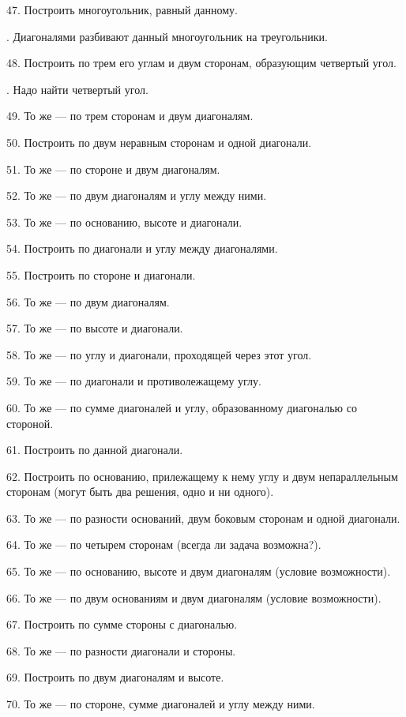 \documentclass[oneside]{book}
\begin{document}
47.
Построить многоугольник, равный данному.

.
Диагоналями разбивают данный многоугольник на треугольники.

48.
Построить  по трем его углам и двум сторонам, образующим четвертый угол.

.
Надо найти четвертый угол.

49.
То же — по трем сторонам и двум диагоналям.

50.
Построить  по двум неравным сторонам и одной диагонали.

51.
То же — по стороне и двум диагоналям.

52.
То же — по двум диагоналям и углу между ними.

53.
То же — по основанию, высоте и диагонали.

54.
Построить  по диагонали и углу между диагоналями.

55.
Построить  по стороне и диагонали.

56.
То же — по двум диагоналям.

57.
То же — по высоте и диагонали.

58.
То же — по углу и диагонали, проходящей через этот угол.

59.
То же — по диагонали и противолежащему углу.

60.
То же — по сумме диагоналей и углу, образованному диагональю со стороной.

61.
Построить  по данной диагонали.

62.
Построить  по основанию, прилежащему к нему углу и двум непараллельным сторонам (могут быть два решения, одно и ни одного).

63.
То же — по разности оснований, двум боковым сторонам и одной диагонали.

64.
То же — по четырем сторонам (всегда ли задача возможна?).

65.
То же — по основанию, высоте и двум диагоналям (условие возможности).

66.
То же — по двум основаниям и двум диагоналям (условие возможности).

67.
Построить  по сумме стороны с диагональю.

68.
То же — по разности диагонали и стороны.

69.
Построить  по двум диагоналям и высоте.

70.
То же — по стороне, сумме диагоналей и углу между ними.
\end{document}
